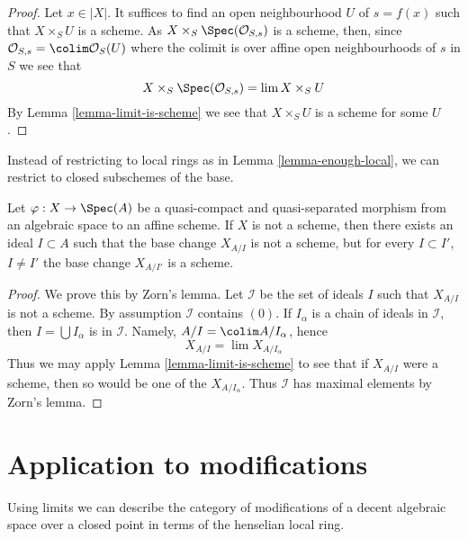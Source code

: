 \begin{proof}
Let $x \in |X|$. It suffices to find an open neighbourhood $U$ of
$s = f(x)$ such that $X \times_S U$ is a scheme.
As $X \times_S \Spec(\mathcal{O}_{S, s})$ is a scheme, then, since
$\mathcal{O}_{S, s} = \colim \mathcal{O}_S(U)$ where the colimit is
over affine open neighbourhoods of $s$ in $S$ we see that
$$
X \times_S \Spec(\mathcal{O}_{S, s}) = \lim X \times_S U
$$
By Lemma \ref{lemma-limit-is-scheme} we see that $X \times_S U$
is a scheme for some $U$.
\end{proof}

\noindent
Instead of restricting to local rings as in Lemma \ref{lemma-enough-local},
we can restrict to closed subschemes of the base.

\begin{lemma}
\label{lemma-maximal-ideal}
Let $\varphi : X \to \Spec(A)$ be a quasi-compact and quasi-separated
morphism from an algebraic space to an affine scheme.
If $X$ is not a scheme, then there exists an ideal $I \subset A$
such that the base change $X_{A/I}$ is not a scheme, but
for every $I \subset I'$, $I \not = I'$ the base change
$X_{A/I'}$ is a scheme.
\end{lemma}

\begin{proof}
We prove this by Zorn's lemma. Let $\mathcal{I}$ be the set
of ideals $I$ such that $X_{A/I}$ is not a scheme. By
assumption $\mathcal{I}$ contains $(0)$. If $I_\alpha$ is
a chain of ideals in $\mathcal{I}$, then
$I = \bigcup I_\alpha$ is in $\mathcal{I}$. Namely,
$A/I = \colim A/I_\alpha$, hence
$$
X_{A/I} = \lim X_{A/I_\alpha}
$$
Thus we may apply Lemma \ref{lemma-limit-is-scheme} to see that if $X_{A/I}$
were a scheme, then so would be one of the $X_{A/I_\alpha}$.
Thus $\mathcal{I}$ has maximal elements by Zorn's lemma.
\end{proof}




\section{Application to modifications}
\label{section-modifications-at-a-point}

\noindent
Using limits we can describe the category of modifications of
a decent algebraic space over a closed point in terms of the
henselian local ring.

